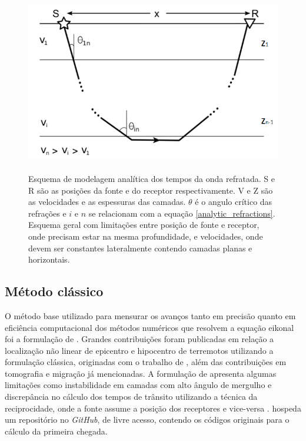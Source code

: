 \begin{figure}[H]
	\centering
	\includegraphics[width = 14cm, height = 8cm]{Imgs/RevisaoBibliografica/refracted_analytic.png}
	\caption{Esquema de modelagem analítica dos tempos da onda refratada. S e R são as posições da fonte e do receptor respectivamente. V e Z são as velocidades e as espessuras das camadas. $\theta$ é o angulo crítico das refrações e $i$ e $n$ se relacionam com a equação \ref{analytic_refractions}. Esquema geral com limitações entre posição de fonte e receptor, onde precisam estar na mesma profundidade, e velocidades, onde devem ser constantes lateralmente contendo camadas planas e horizontais.}
	\label{fig:refracted_analytic}
\end{figure}

\subsection*{Método clássico}

O método base utilizado para mensurar os avanços tanto em precisão quanto em eficiência computacional dos métodos numéricos que resolvem a equação eikonal foi a formulação de . Grandes contribuições foram publicadas em relação a localização não linear de epicentro e hipocentro de terremotos utilizando a formulação clássica, originadas com o trabalho de  , além das contribuições em tomografia e migração já mencionadas. A formulação de  apresenta algumas limitações como instabilidade em camadas com alto ângulo de mergulho \cite{afnimar2000finite} e discrepância no cálculo dos tempos de trânsito utilizando a técnica da reciprocidade, onde a fonte assume a posição dos receptores e vice-versa \cite{tryggvason2006travel}.  hospeda um repositório no \textit{GitHub}, de livre acesso, contendo os códigos originais para o cálculo da primeira chegada.  

